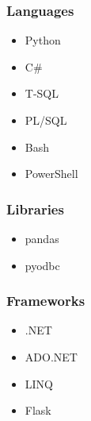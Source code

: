 \documentclass[letterpaper]{article}
\begin{document}
\begin{fullwidth}[width=\linewidth+2cm]
\begin{minipage}[t]{0.65\linewidth}
\end{minipage}
\hfill
\begin{minipage}[t]{0.25\linewidth}
\begin{tcolorbox}[breakable, capture=minipage, title=Skills]
  \subsubsection*{Languages}
  \begin{itemize}
    \item Python \item C\# \item T-SQL \item PL/SQL \item Bash \item PowerShell
  \end{itemize}
    \subsubsection*{Libraries}
    \begin{itemize} \item pandas \item pyodbc \end{itemize}
    \subsubsection*{Frameworks}
    \begin{itemize} \item .NET \item ADO.NET \item LINQ \item Flask \end{itemize}

\end{tcolorbox}
\end{minipage}
\end{fullwidth}
\end{document}
